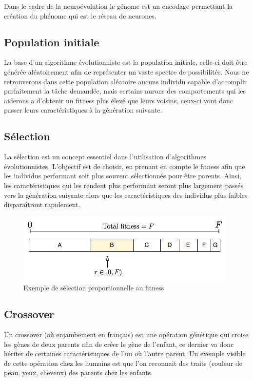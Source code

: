 \documentclass{article}
\begin{document}
Dans le cadre de la neuroévolution le génome est un encodage permettant la création du phénome qui est le réseau de neurones.

\subsection{Population initiale}

La base d'un algorithme évolutionniste est la population initiale, celle-ci doit être générée aléatoirement afin de représenter un vaste spectre de possibilités. 
Nous ne retrouverons dans cette population aléatoire aucuns individu capable d'accomplir parfaitement la tâche demandée, mais certains aurons des comportements qui les aiderons a d'obtenir un fitness plus élevé que leurs voisins, ceux-ci vont donc passer leurs caractéristiques à la génération suivante.

\subsection{Sélection}

La sélection est un concept essentiel dans l'utilisation d'algorithmes évolutionnistes. L'objectif est de choisir, en prenant en compte le fitness afin que les individus performant soit plus souvent sélectionnés pour être parents. Ainsi, les caractéristiques qui les rendent plus performant seront plus largement passés vers la génération suivante alors que les caractéristiques des individus plus faibles disparaîtront rapidement.\cite{wikifps}

\begin{figure}[H]
\begin{center}
	\includegraphics[scale=0.6]{fps.png} 
	\caption{Exemple de sélection proportionnelle au fitness\cite{wikifps}}
\end{center}
\end{figure}

\subsection{Crossover}

Un crossover (où enjambement en français) est une opération génétique qui croise les gènes de deux parents afin de créer le gène de l'enfant, ce dernier va donc hériter de certaines caractéristiques de l'un où l'autre parent. Un exemple visible de cette opération chez les humains est que l'on reconnait des traits (couleur de peau, yeux, cheveux) des parents chez les enfants.\cite{wikicrossover}\\
\end{document}
